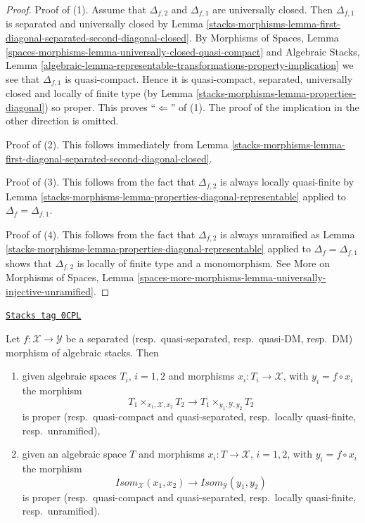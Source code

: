 \begin{proof}
Proof of (1). Assume that $\Delta_{f, 2}$ and $\Delta_{f, 1}$ are
universally closed. Then $\Delta_{f, 1}$ is separated and universally
closed by
Lemma \ref{stacks-morphisms-lemma-first-diagonal-separated-second-diagonal-closed}.
By
Morphisms of Spaces,
Lemma \ref{spaces-morphisms-lemma-universally-closed-quasi-compact}
and
Algebraic Stacks,
Lemma \ref{algebraic-lemma-representable-transformations-property-implication}
we see that $\Delta_{f, 1}$ is quasi-compact.
Hence it is quasi-compact, separated, universally closed and locally of
finite type (by
Lemma \ref{stacks-morphisms-lemma-properties-diagonal})
so proper. This proves ``$\Leftarrow$'' of (1).
The proof of the implication in the other direction is omitted.

\medskip\noindent
Proof of (2). This follows immediately from
Lemma \ref{stacks-morphisms-lemma-first-diagonal-separated-second-diagonal-closed}.

\medskip\noindent
Proof of (3). This follows from the fact that $\Delta_{f, 2}$ is always locally
quasi-finite by
Lemma \ref{stacks-morphisms-lemma-properties-diagonal-representable}
applied to $\Delta_f = \Delta_{f, 1}$.

\medskip\noindent
Proof of (4). This follows from the fact that $\Delta_{f, 2}$ is always
unramified as
Lemma \ref{stacks-morphisms-lemma-properties-diagonal-representable}
applied to $\Delta_f = \Delta_{f, 1}$ shows that
$\Delta_{f, 2}$ is locally of finite type and a monomorphism.
See
More on Morphisms of Spaces,
Lemma \ref{spaces-more-morphisms-lemma-universally-injective-unramified}.
\end{proof}

\begin{lemma}
\label{stacks-morphisms-lemma-separated-implies-isom}
\href{https://stacks.math.columbia.edu/tag/0CPL}{\texttt{Stacks tag 0CPL}}

Let $f : \mathcal{X} \to \mathcal{Y}$ be a separated
(resp.\ quasi-separated, resp.\ quasi-DM, resp.\ DM)
morphism of algebraic stacks. Then
\begin{enumerate}
\item given algebraic spaces $T_i$, $i = 1, 2$ and morphisms
$x_i : T_i \to \mathcal{X}$, with $y_i = f \circ x_i$ the morphism
$$
T_1 \times_{x_1, \mathcal{X}, x_2} T_2 \longrightarrow
T_1 \times_{y_1, \mathcal{Y}, y_2} T_2
$$
is proper (resp.\ quasi-compact and quasi-separated,
resp.\ locally quasi-finite, resp.\ unramified),
\item given an algebraic space $T$ and morphisms
$x_i : T \to \mathcal{X}$, $i = 1, 2$, with $y_i = f \circ x_i$ the morphism
$$
\mathit{Isom}_\mathcal{X}(x_1, x_2) \longrightarrow
\mathit{Isom}_\mathcal{Y}(y_1, y_2)
$$
is proper (resp.\ quasi-compact and quasi-separated,
resp.\ locally quasi-finite, resp.\ unramified).
\end{enumerate}
\end{lemma}

